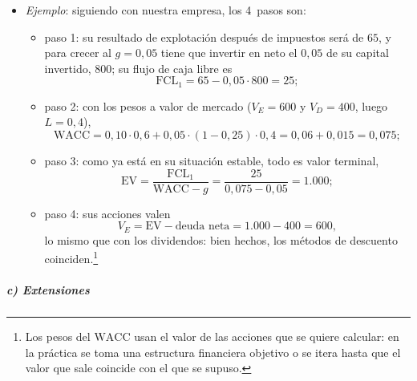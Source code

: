 \documentclass[11pt]{article}
\begin{document}
\begin{infografia}[H]
\centering
\caption{Del valor de la empresa al valor de las acciones: métodos indirectos y directos}\label{figu:valor-empresa}
\end{infografia}

\begin{itemize}
\item \emph{Ejemplo}: siguiendo con nuestra empresa, los 4~pasos son:
  \begin{itemize}
  \item paso 1: su resultado de explotación después de impuestos será de $65$, y para crecer al $g=0{,}05$ tiene que invertir en neto el $0{,}05$ de su capital invertido, $800$; su flujo de caja libre es
  \[
  \mathrm{FCL}_1=65-0{,}05\cdot800=25;
  \]
  \item paso 2: con los pesos a valor de mercado ($V_E=600$ y $V_D=400$, luego $L=0{,}4$),
  \[
  \mathrm{WACC}=0{,}10\cdot0{,}6+0{,}05\cdot(1-0{,}25)\cdot0{,}4=0{,}06+0{,}015=0{,}075;
  \]
  \item paso 3: como ya está en su situación estable, todo es valor terminal,
  \[
  \mathrm{EV}=\frac{\mathrm{FCL}_1}{\mathrm{WACC}-g}=\frac{25}{0{,}075-0{,}05}=1.000;
  \]
  \item paso 4: sus acciones valen
  \[
  V_E=\mathrm{EV}-\text{deuda neta}=1.000-400=600,
  \]
  lo mismo que con los dividendos: bien hechos, los métodos de descuento coinciden.\footnote{Los pesos del $\mathrm{WACC}$ usan el valor de las acciones que se quiere calcular: en la práctica se toma una estructura financiera objetivo o se itera hasta que el valor que sale coincide con el que se supuso.}
  \end{itemize}
\end{itemize}

\subparagraph{c) Extensiones}
\end{document}
